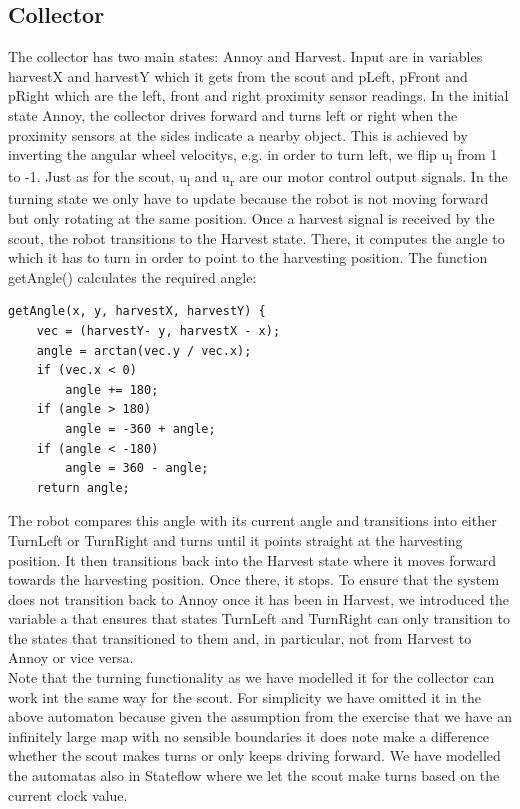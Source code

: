 \documentclass[12pt]{article}
\begin{document}
\subsection* {Collector}
The collector has two main states: Annoy and Harvest. Input are in variables harvestX and harvestY which it gets from the scout and pLeft, pFront and pRight which are the left, front and right proximity sensor readings. In the initial state Annoy, the collector drives forward and turns left or right when the proximity sensors at the sides indicate a nearby object. This is achieved by inverting the angular wheel velocitys, e.g. in order to turn left, we flip u\textsubscript{l} from 1 to -1. Just as for the scout, u\textsubscript{l} and u\textsubscript{r} are our motor control output signals. In the turning state we only have to update \Theta because the robot is not moving forward but only rotating at the same position. Once a harvest signal is received by the scout, the robot transitions to the Harvest state. There, it computes the angle to which it has to turn in order to point to the harvesting position. The function getAngle() calculates the required angle:
\begin{lstlisting}
getAngle(x, y, harvestX, harvestY) {
    vec = (harvestY- y, harvestX - x);
    angle = arctan(vec.y / vec.x);
    if (vec.x < 0) 
        angle += 180;
    if (angle > 180) 
        angle = -360 + angle;
    if (angle < -180) 
        angle = 360 - angle;
    return angle;
\end{lstlisting}
The robot compares this angle with its current angle \Theta  and transitions into either TurnLeft or TurnRight and turns until it points straight at the harvesting position. It then transitions back into the Harvest state where it moves forward towards the harvesting position. Once there, it stops. To ensure that the system does not transition back to Annoy once it has been in Harvest, we introduced the variable a that ensures that states TurnLeft and TurnRight can only transition to the states that transitioned to them and, in particular, not from Harvest to Annoy or vice versa.\\
Note that the turning functionality as we have modelled it for the collector can work int the same way for the scout. For simplicity we have omitted it in the above automaton because given the assumption from the exercise that we have an infinitely large map with no sensible boundaries it does note make a difference whether the scout makes turns or only keeps driving forward. We have modelled the automatas also in Stateflow where we let the scout make turns based on the current clock value.\\
\end{document}
